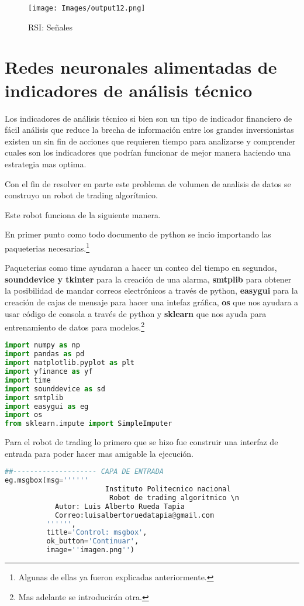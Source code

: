 \documentclass[letterpaper,12pt,oneside]{book}
\begin{document}
\begin{figure}[ht]
	\centering
	\texttt{[image: Images/output12.png]}
	\caption{RSI: Señales}
	\label{fig:m13}
\end{figure}


\section{Redes neuronales alimentadas de indicadores de análisis técnico}

Los indicadores de análisis técnico si bien son un tipo de indicador financiero de fácil análisis que reduce la brecha de información entre los grandes inversionistas existen un sin fin de acciones que requieren tiempo para analizarse y comprender cuales son los indicadores que podrían funcionar de mejor manera haciendo una estrategia mas optima.


Con el fin de resolver en parte este problema de volumen de analisis de datos se construyo un robot de trading algorítmico.

Este robot funciona de la siguiente manera.

En primer punto como todo documento de python se incio importando las paqueterias necesarias.\footnote{Algunas de ellas ya fueron explicadas anteriormente.}


Paqueterias como time ayudaran a hacer un conteo del tiempo en segundos, \textbf{sounddevice y tkinter} para la creación de una alarma, \textbf{smtplib} para obtener la posibilidad de mandar correos electrónicos a través de python, \textbf{easygui} para la creación de cajas de mensaje para hacer una intefaz gráfica, \textbf{os} que nos ayudara a usar código de consola a través de python y \textbf{sklearn} que nos ayuda para entrenamiento de datos para modelos.\footnote{Mas adelante se introducirán otra.}

\begin{lstlisting}[language=Python]
import numpy as np 
import pandas as pd 
import matplotlib.pyplot as plt
import yfinance as yf
import time
import sounddevice as sd
import smtplib
import easygui as eg
import os
from sklearn.impute import SimpleImputer
\end{lstlisting}


Para el robot de trading lo primero que se hizo fue construir una interfaz de entrada  para poder hacer mas amigable la ejecución.


\begin{lstlisting}[language=Python]
##-------------------- CAPA DE ENTRADA
eg.msgbox(msg=''''''
                        Instituto Politecnico nacional
                         Robot de trading algoritmico \n
            Autor: Luis Alberto Rueda Tapia
            Correo:luisalbertoruedatapia@gmail.com                   
          '''''',
          title='Control: msgbox', 
          ok_button='Continuar',
          image=''imagen.png'')
\end{lstlisting}
\end{document}
